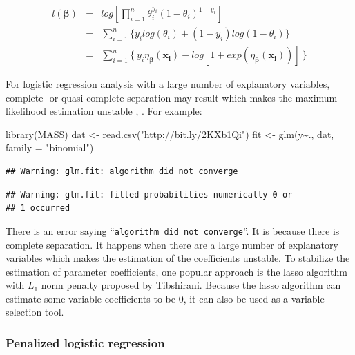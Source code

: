 \documentclass[
  12pt,
]{krantz}
\makeatletter
\newenvironment{Shaded}{\begin{snugshade}}{\end{snugshade}}
\newcommand{\AttributeTok}[1]{\textcolor[rgb]{0.61,0.61,0.61}{#1}}
\newcommand{\FunctionTok}[1]{\textcolor[rgb]{0,0,0}{#1}}
\newcommand{\NormalTok}[1]{#1}
\newcommand{\OtherTok}[1]{\textcolor[rgb]{0.37,0.37,0.37}{#1}}
\newcommand{\SpecialCharTok}[1]{\textcolor[rgb]{0,0,0}{#1}}
\newcommand{\StringTok}[1]{\textcolor[rgb]{0.5,0.5,0.5}{#1}}
\newenvironment{kframe}{%
\medskip{}
\setlength{\fboxsep}{.8em}
 \def\at@end@of@kframe{}%
 \ifinner\ifhmode%
  \def\at@end@of@kframe{\end{minipage}}%
  \begin{minipage}{\columnwidth}%
 \fi\fi%
 \def\FrameCommand##1{\hskip\@totalleftmargin \hskip-\fboxsep
 \colorbox{shadecolor}{##1}\hskip-\fboxsep
     \hskip-\linewidth \hskip-\@totalleftmargin \hskip\columnwidth}%
 \MakeFramed {\advance\hsize-\width
   \@totalleftmargin\z@ \linewidth\hsize
   \@setminipage}}%
 {\par\unskip\endMakeFramed%
 \at@end@of@kframe}
\renewenvironment{Shaded}{\begin{kframe}}{\end{kframe}}
\makeatother
\begin{document}
\begin{eqnarray*}
l(\symbf{\beta})&=&log[\prod_{i=1}^{n}\theta_{i}^{y_{i}}(1-\theta_{i})^{1-y_{i}}]\\
&=&\sum_{i=1}^{n}\{y_{i}log(\theta_{i})+(1-y_{i})log(1-\theta_{i})\}\\
&=&\sum_{i=1}^{n}\{\ y_{i}\eta_{\symbf{\beta}}(\mathbf{x_{i}})-log[1+exp(\eta_{\symbf{\beta}}(\mathbf{x_{i}}))]\ \}
\label{eq:logisticlikelihood}
\end{eqnarray*}

For logistic regression analysis with a large number of explanatory variables, complete- or quasi-complete-separation may result which makes
the maximum likelihood estimation unstable \citep{Wed1976}, \citep{albert1984}. For example:

\begin{Shaded}
\begin{Highlighting}[]
\FunctionTok{library}\NormalTok{(MASS)}
\NormalTok{dat }\OtherTok{\textless{}{-}} \FunctionTok{read.csv}\NormalTok{(}\StringTok{"http://bit.ly/2KXb1Qi"}\NormalTok{)}
\NormalTok{fit }\OtherTok{\textless{}{-}} \FunctionTok{glm}\NormalTok{(y}\SpecialCharTok{\textasciitilde{}}\NormalTok{., dat, }\AttributeTok{family =} \StringTok{"binomial"}\NormalTok{)}
\end{Highlighting}
\end{Shaded}

\begin{verbatim}
## Warning: glm.fit: algorithm did not converge
\end{verbatim}

\begin{verbatim}
## Warning: glm.fit: fitted probabilities numerically 0 or
## 1 occurred
\end{verbatim}

There is an error saying ``\texttt{algorithm\ did\ not\ converge}''. It is because there is complete separation. It happens when there are a large number of explanatory variables which makes the estimation of the coefficients unstable. To stabilize the estimation of parameter coefficients, one popular approach is the lasso algorithm with \(L_1\) norm penalty proposed by Tibshirani\citep{Tibshirani1996}. Because the lasso algorithm can estimate some variable coefficients to be 0, it can also be used as a variable selection tool.

\hypertarget{penalized-logistic-regression-1}{%
\subsubsection{Penalized logistic regression}\label{penalized-logistic-regression-1}}
\end{document}
